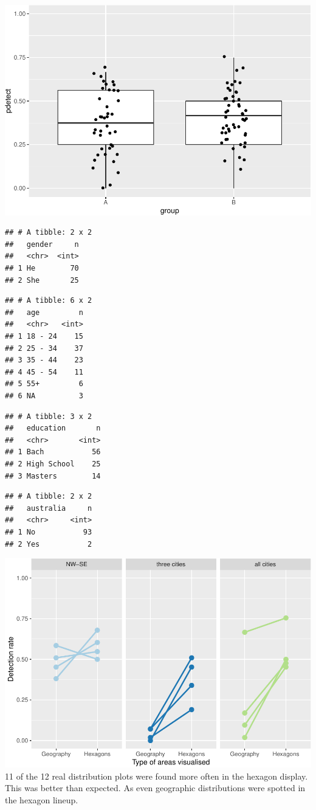 \documentclass[conference,final,]{IEEEtran}
\makeatletter
\def\maxwidth{\ifdim\Gin@nat@width>\linewidth\linewidth
\else\Gin@nat@width\fi}
\let\Oldincludegraphics\includegraphics
\renewcommand{\includegraphics}[1]{\Oldincludegraphics[width=\maxwidth]{#1}}
\makeatother
\begin{document}
\includegraphics{survey_files/figure-latex/unnamed-chunk-4-1.pdf}

\begin{verbatim}
## # A tibble: 2 x 2
##   gender     n
##   <chr>  <int>
## 1 He        70
## 2 She       25
\end{verbatim}

\begin{verbatim}
## # A tibble: 6 x 2
##   age         n
##   <chr>   <int>
## 1 18 - 24    15
## 2 25 - 34    37
## 3 35 - 44    23
## 4 45 - 54    11
## 5 55+         6
## 6 NA          3
\end{verbatim}

\begin{verbatim}
## # A tibble: 3 x 2
##   education       n
##   <chr>       <int>
## 1 Bach           56
## 2 High School    25
## 3 Masters        14
\end{verbatim}

\begin{verbatim}
## # A tibble: 2 x 2
##   australia     n
##   <chr>     <int>
## 1 No           93
## 2 Yes           2
\end{verbatim}

\includegraphics{survey_files/figure-latex/unnamed-chunk-7-1.pdf} 11 of
the 12 real distribution plots were found more often in the hexagon
display. This was better than expected. As even geographic distributions
were spotted in the hexagon lineup.
\end{document}
